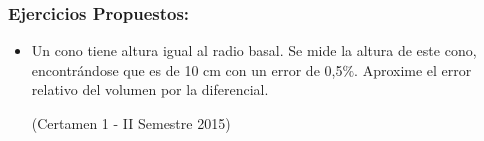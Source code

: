 \documentclass[utf8x]{beamer}
\begin{document}
\begin{frame}
\frametitle{ Ejercicios Propuestos:}
\begin{itemize}
\item
Un cono tiene altura igual al radio basal. Se mide la altura de este cono, encontrándose que es de 10 cm con un error de 0,5$\%$.
Aproxime el error relativo del volumen por la diferencial.

(Certamen 1 - II Semestre 2015)


\end{itemize}
\end{frame}
\end{document}

